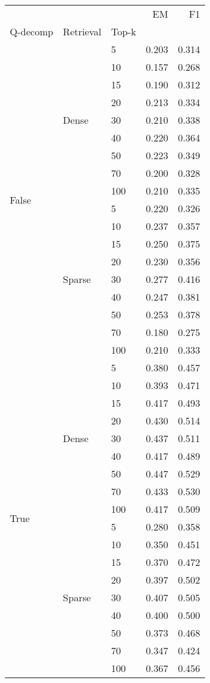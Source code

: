 \begin{tabular}{lllrr}
\toprule
 &  &  & EM & F1 \\
Q-decomp & Retrieval & Top-k &  &  \\
\midrule
\multirow[t]{18}{*}{False} & \multirow[t]{9}{*}{Dense} & 5 & 0.203 & 0.314 \\
 &  & 10 & 0.157 & 0.268 \\
 &  & 15 & 0.190 & 0.312 \\
 &  & 20 & 0.213 & 0.334 \\
 &  & 30 & 0.210 & 0.338 \\
 &  & 40 & 0.220 & 0.364 \\
 &  & 50 & 0.223 & 0.349 \\
 &  & 70 & 0.200 & 0.328 \\
 &  & 100 & 0.210 & 0.335 \\
\cline{2-5}
 & \multirow[t]{9}{*}{Sparse} & 5 & 0.220 & 0.326 \\
 &  & 10 & 0.237 & 0.357 \\
 &  & 15 & 0.250 & 0.375 \\
 &  & 20 & 0.230 & 0.356 \\
 &  & 30 & 0.277 & 0.416 \\
 &  & 40 & 0.247 & 0.381 \\
 &  & 50 & 0.253 & 0.378 \\
 &  & 70 & 0.180 & 0.275 \\
 &  & 100 & 0.210 & 0.333 \\
\cline{1-5} \cline{2-5}
\multirow[t]{18}{*}{True} & \multirow[t]{9}{*}{Dense} & 5 & 0.380 & 0.457 \\
 &  & 10 & 0.393 & 0.471 \\
 &  & 15 & 0.417 & 0.493 \\
 &  & 20 & 0.430 & 0.514 \\
 &  & 30 & 0.437 & 0.511 \\
 &  & 40 & 0.417 & 0.489 \\
 &  & 50 & 0.447 & 0.529 \\
 &  & 70 & 0.433 & 0.530 \\
 &  & 100 & 0.417 & 0.509 \\
\cline{2-5}
 & \multirow[t]{9}{*}{Sparse} & 5 & 0.280 & 0.358 \\
 &  & 10 & 0.350 & 0.451 \\
 &  & 15 & 0.370 & 0.472 \\
 &  & 20 & 0.397 & 0.502 \\
 &  & 30 & 0.407 & 0.505 \\
 &  & 40 & 0.400 & 0.500 \\
 &  & 50 & 0.373 & 0.468 \\
 &  & 70 & 0.347 & 0.424 \\
 &  & 100 & 0.367 & 0.456 \\
\cline{1-5} \cline{2-5}
\bottomrule
\end{tabular}
